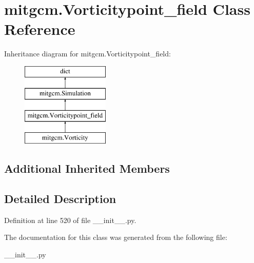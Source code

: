 \hypertarget{classmitgcm_1_1Vorticitypoint__field}{}\section{mitgcm.\+Vorticitypoint\+\_\+field Class Reference}
\label{classmitgcm_1_1Vorticitypoint__field}
Inheritance diagram for mitgcm.\+Vorticitypoint\+\_\+field\+:\begin{figure}[H]
\begin{center}
\leavevmode
\includegraphics[height=4.000000cm]{classmitgcm_1_1Vorticitypoint__field}
\end{center}
\end{figure}
\subsection*{Additional Inherited Members}


\subsection{Detailed Description}


Definition at line 520 of file \+\_\+\+\_\+init\+\_\+\+\_\+.\+py.



The documentation for this class was generated from the following file\+:\begin{DoxyCompactItemize}
\item 
\+\_\+\+\_\+init\+\_\+\+\_\+.\+py\end{DoxyCompactItemize}
